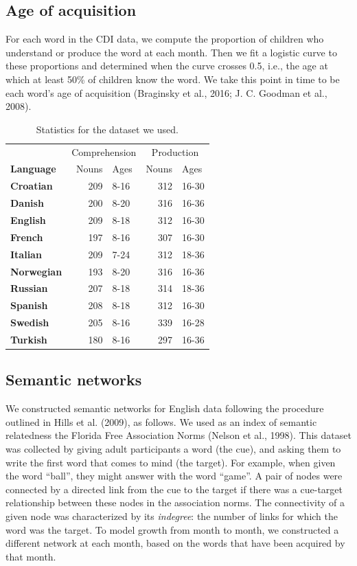 \documentclass[english,floatsintext,man]{apa6}
\theoremstyle{definition}
\theoremstyle{definition}
\theoremstyle{definition}
\theoremstyle{remark}
\begin{document}
\subsection{Age of acquisition}\label{age-of-acquisition}

For each word in the CDI data, we compute the proportion of children who
understand or produce the word at each month. Then we fit a logistic
curve to these proportions and determined when the curve crosses 0.5,
i.e., the age at which at least 50\% of children know the word. We take
this point in time to be each word's age of acquisition (Braginsky et
al., 2016; J. C. Goodman et al., 2008).

\begin{table}

\caption{\label{tab:stats}Statistics for the dataset we used.}
\centering
\begin{tabular}[t]{>{\bfseries}lrlrl}
\toprule
\multicolumn{1}{c}{} & \multicolumn{2}{c}{Comprehension} & \multicolumn{2}{c}{Production} \\
\cmidrule(l{2pt}r{2pt}){2-3} \cmidrule(l{2pt}r{2pt}){4-5}
Language & Nouns & Ages & Nouns & Ages\\
\midrule
Croatian & 209 & 8-16 & 312 & 16-30\\
Danish & 200 & 8-20 & 316 & 16-36\\
English & 209 & 8-18 & 312 & 16-30\\
French & 197 & 8-16 & 307 & 16-30\\
Italian & 209 & 7-24 & 312 & 18-36\\
Norwegian & 193 & 8-20 & 316 & 16-36\\
Russian & 207 & 8-18 & 314 & 18-36\\
Spanish & 208 & 8-18 & 312 & 16-30\\
Swedish & 205 & 8-16 & 339 & 16-28\\
Turkish & 180 & 8-16 & 297 & 16-36\\
\bottomrule
\end{tabular}
\end{table}

\subsection{Semantic networks}\label{semantic-networks}

We constructed semantic networks for English data following the
procedure outlined in Hills et al. (2009), as follows. We used as an
index of semantic relatedness the Florida Free Association Norms (Nelson
et al., 1998). This dataset was collected by giving adult participants a
word (the cue), and asking them to write the first word that comes to
mind (the target). For example, when given the word \enquote{ball}, they
might answer with the word \enquote{game}. A pair of nodes were
connected by a directed link from the cue to the target if there was a
cue-target relationship between these nodes in the association norms.
The connectivity of a given node was characterized by its
\emph{indegree}: the number of links for which the word was the target.
To model growth from month to month, we constructed a different network
at each month, based on the words that have been acquired by that month.
\end{document}
